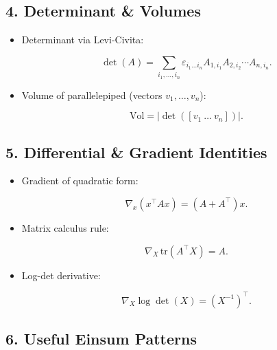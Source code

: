 \documentclass[
  letterpaper,
  DIV=11,
  numbers=noendperiod]{scrreprt}
\begin{document}
\subsection{4. Determinant \& Volumes}\label{determinant-volumes}

\begin{itemize}
\item
  Determinant via Levi-Civita:

  \[
  \det(A) = \sum_{i_1,\dots,i_n} \varepsilon_{i_1 \dots i_n}
  A_{1,i_1} A_{2,i_2} \cdots A_{n,i_n}.
  \]
\item
  Volume of parallelepiped (vectors \(v_1,\dots,v_n\)):

  \[
  \text{Vol} = |\det([v_1 \ \dots \ v_n])|.
  \]
\end{itemize}

\subsection{5. Differential \& Gradient
Identities}\label{differential-gradient-identities}

\begin{itemize}
\item
  Gradient of quadratic form:

  \[
  \nabla_x (x^\top A x) = (A + A^\top)x.
  \]
\item
  Matrix calculus rule:

  \[
  \nabla_X \,\mathrm{tr}(A^\top X) = A.
  \]
\item
  Log-det derivative:

  \[
  \nabla_X \log \det(X) = (X^{-1})^\top.
  \]
\end{itemize}

\subsection{6. Useful Einsum Patterns}\label{useful-einsum-patterns}
\end{document}
